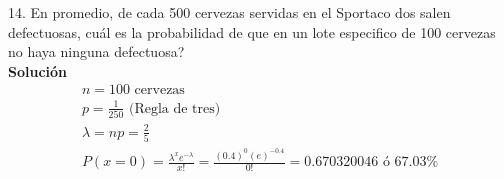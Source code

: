 
14. En promedio, de cada 500 cervezas servidas en el Sportaco dos salen defectuosas, cuál es la probabilidad de que en un lote especifico de 100 cervezas no haya ninguna defectuosa?
\\\textbf{Solución}
\begin{gather*}
    n = 100 \text{ cervezas}\\
    p = \frac{1}{250} \text{ (Regla de tres)}\\
    \lambda = np = \frac{2}{5}\\
    P(x=0) = \frac{{\lambda}^{x}{e}^{-\lambda}}{x!}=\frac{(0.4)^{0}(e)^{-0.4}}{0!}= 0.670320046 \text{ ó } 67.03\%\\
\end{gather*}
